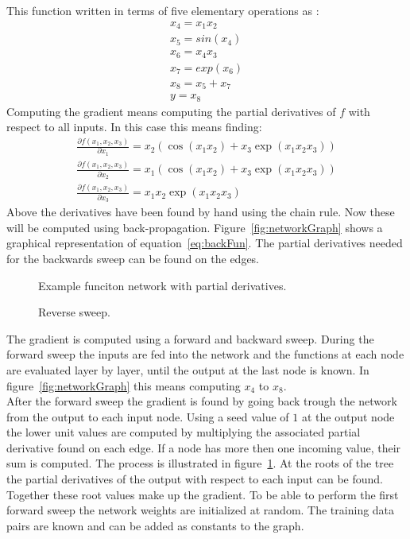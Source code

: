 This function written in terms of five elementary operations as \cite[page 70]{Diehl2013}:
\begin{align}
x_4 = x_1 x_2 \\
x_5 = sin(x_4)\\
x_6 = x_4 x_3 \\
x_7 = exp(x_6) \\
x_8 = x_5 + x_7 \\
y = x_8
\end{align}
Computing the gradient means computing the partial derivatives of $f$ with respect to all inputs. In this case this means finding:
\begin{align}
\frac{\partial f(x_1,x_2,x_3)}{\partial x_1} = x_2 (\cos(x_1 x_2) + x_3 \exp(x_1 x_2 x_3)) \\
\frac{\partial f(x_1,x_2,x_3)}{\partial x_2} = x_1 (\cos(x_1 x_2) + x_3 \exp(x_1 x_2 x_3)) \\
\frac{\partial f(x_1,x_2,x_3)}{\partial x_3} = x_1  x_2 \exp(x_1 x_2 x_3)
\end{align} 
Above the derivatives have been found by hand using the chain rule. Now these will be computed using back-propagation. Figure~\ref{fig:networkGraph} shows a graphical representation of equation~\ref{eq:backFun}. The partial derivatives needed for the backwards sweep can be found on the edges. \\
\begin{figure}
\centering

\caption{Example funciton network with partial derivatives.}
\label{fig:networkGraph}

\caption{Reverse sweep.}
\label{fig:reverseSweep}
\end{figure}
The gradient is computed using a forward and backward sweep. During the forward sweep the inputs are fed into the network and the functions at each node are evaluated layer by layer, until the output at the last node is known. In figure~\ref{fig:networkGraph} this means computing $x_4$ to $x_8$. \\
After the forward sweep the gradient is found by going back trough the network from the output to each input node. Using a seed value of $1$ at the output node the lower unit values are computed by multiplying the associated partial derivative found on each edge. If a node has more then one incoming value, their sum is computed. The process is illustrated in figure~\ref{fig:reverseSweep}. At the roots of the tree the partial derivatives of the output with respect to each input can be found. Together these root values make up the gradient. 
To be able to perform the first forward sweep the network weights are initialized at random. The training data pairs are known and can be added as constants to the graph. 

